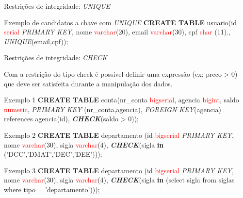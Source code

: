 \documentclass[xcolor=x11names,compress]{beamer}
\begin{document}
\begin{frame}{Restrições de integridade: \textit{UNIQUE}}

\begin{alertblock}{Exemplo de candidatos a chave com \textit{UNIQUE}}
\textbf{CREATE TABLE} usuario(id \textcolor{red}{serial} \textit{PRIMARY KEY}, nome \textcolor{red}{varchar}(20), email \textcolor{red}{varchar}(30), cpf \textcolor {red}{char} (11)., \textit{UNIQUE}(email,cpf));
\end{alertblock}

\end{frame}

\begin{frame}[allowframebreaks]{Restrições de integridade: \textit{CHECK}}

Com a restrição do tipo check é possível definir uma expressão (ex: preco > 0) que deve ser satisfeita durante a manipulação dos dados. 

\begin{alertblock}{Exemplo 1}
\textbf{CREATE TABLE} conta(nr\_conta \textcolor{red}{bigserial}, agencia \textcolor{red}{bigint}, saldo \textcolor{red}{numeric}, \textit{PRIMARY KEY} (nr\_conta,agencia), \textit{FOREIGN KEY}(agencia) references agencia(id), \textit{\textbf{CHECK}}(saldo > 0));
\end{alertblock}

\begin{alertblock}{Exemplo 2}
\textbf{CREATE TABLE} departamento (id \textcolor{red}{bigserial} \textit{PRIMARY KEY}, nome \textcolor{red}{varchar}(30), sigla \textcolor{red}{varchar}(4),  \textit{\textbf{CHECK}}(sigla \textbf{in} ('DCC','DMAT','DEC','DEE')));
\end{alertblock}

\begin{alertblock}{Exemplo 3}
\textbf{CREATE TABLE} departamento (id \textcolor{red}{bigserial} \textit{PRIMARY KEY}, nome \textcolor{red}{varchar}(30), sigla \textcolor{red}{varchar}(4),  \textit{\textbf{CHECK}}(sigla \textbf{in} (select sigla from siglas where tipo = 'departamento')));
\end{alertblock}

\end{frame}
\end{document}
